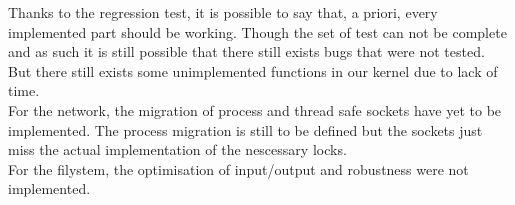 \documentclass[a4paper,10pt]{article}
\begin{document}
Thanks to the regression test, it is possible to say that, a priori, every implemented part should be working. Though
the set of test can not be complete and as such it is still possible that there still exists bugs that were not 
tested.\\
But there still exists some unimplemented functions in our kernel due to lack of time.\\
For the network, the migration of process and thread safe sockets have yet to be implemented. The process migration
is still to be defined but the sockets just miss the actual implementation of the nescessary locks.\\
For the filystem, the optimisation of input/output and robustness were not implemented.\\
\end{document}
